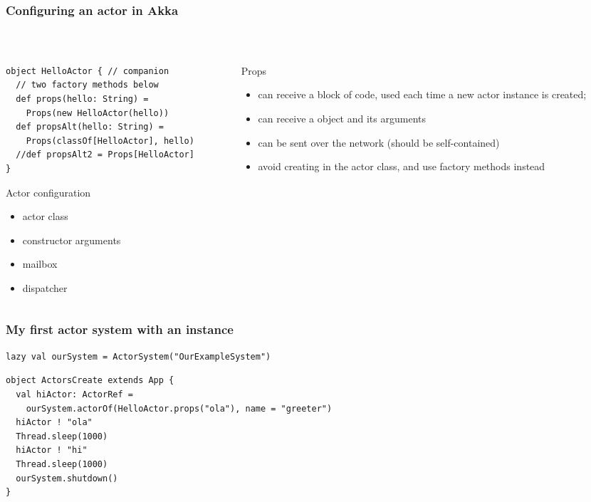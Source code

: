 \documentclass[aspectratio=169]{beamer}
\begin{document}
\begin{frame}[fragile]\frametitle{Configuring an actor in Akka}
~\\[-6mm]
\begin{columns}
\begin{column}{0.51\textwidth}
\begin{lstlisting}[emph={Actor, Logging, Props}]
object HelloActor { // companion
  // two factory methods below
  def props(hello: String) =
    Props(new HelloActor(hello))
  def propsAlt(hello: String) =
    Props(classOf[HelloActor], hello)
  //def propsAlt2 = Props[HelloActor]
}
\end{lstlisting}
\begin{exampleblock}{Actor configuration}
  \begin{itemize}
      \item actor class
      \item constructor arguments
      \item mailbox
      \item dispatcher
  \end{itemize} 
\end{exampleblock}
\end{column}
\begin{column}{0.49\textwidth}
\begin{block}{Props}
  \begin{itemize}
    \item can receive a block of code,
     used each time a new actor instance is created;
     \item can receive a  object and its arguments
     \item can be sent over the network (should be self-contained)
     \item avoid creating  in the actor class, and use factory methods instead
  \end{itemize}
\end{block}
\end{column}
\end{columns}
\end{frame}

\begin{frame}[fragile]\frametitle{My first actor system with an instance}
\begin{lstlisting}[emph={Actor, Logging, Props, ourSystem}]
lazy val ourSystem = ActorSystem("OurExampleSystem")
\end{lstlisting}
\begin{lstlisting}[emph={Actor, Logging, Props, ourSystem,shutdown,sleep,actorOf}]
object ActorsCreate extends App {
  val hiActor: ActorRef =
    ourSystem.actorOf(HelloActor.props("ola"), name = "greeter")
  hiActor ! "ola"
  Thread.sleep(1000)
  hiActor ! "hi"
  Thread.sleep(1000)
  ourSystem.shutdown()
}
\end{lstlisting}
\end{frame}
\end{document}
